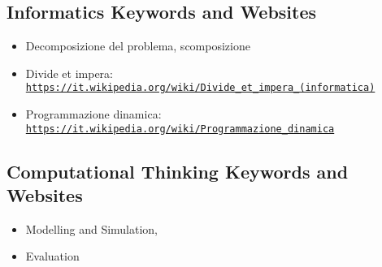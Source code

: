 \documentclass[a4paper,11pt]{report}
\newcommand{\BrochureUrlText}[1]{\texttt{#1}}
\begin{document}
\subsection*{Informatics Keywords and Websites}

\begin{itemize}
  \item Decomposizione del problema, scomposizione
  \item Divide et impera: \href{https://it.wikipedia.org/wiki/Divide_et_impera_(informatica)}{\BrochureUrlText{https://it.wikipedia.org/wiki/Divide\_et\_impera\_(informatica)}}
  \item Programmazione dinamica: \href{https://it.wikipedia.org/wiki/Programmazione_dinamica}{\BrochureUrlText{https://it.wikipedia.org/wiki/Programmazione\_dinamica}}
\end{itemize}


\subsection*{Computational Thinking Keywords and Websites}

\begin{itemize}
  \item Modelling and Simulation,
  \item Evaluation
\end{itemize}
\end{document}
